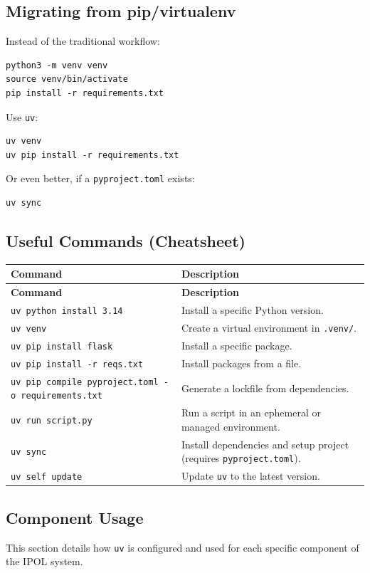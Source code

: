 \documentclass[a4paper,12pt]{article}
\begin{document}
\subsection{Migrating from pip/virtualenv}
Instead of the traditional workflow:
\begin{verbatim}
python3 -m venv venv
source venv/bin/activate
pip install -r requirements.txt
\end{verbatim}
Use \texttt{uv}:
\begin{verbatim}
uv venv
uv pip install -r requirements.txt
\end{verbatim}
Or even better, if a \texttt{pyproject.toml} exists:
\begin{verbatim}
uv sync
\end{verbatim}

\subsection{Useful Commands (Cheatsheet)}

\begin{longtable}{|p{6cm}|p{8cm}|}
\hline
\textbf{Command} & \textbf{Description} \\ \hline
\endfirsthead
\hline
\textbf{Command} & \textbf{Description} \\ \hline
\endhead
\texttt{uv python install 3.14} & Install a specific Python version. \\ \hline
\texttt{uv venv} & Create a virtual environment in \texttt{.venv/}. \\ \hline
\texttt{uv pip install flask} & Install a specific package. \\ \hline
\texttt{uv pip install -r reqs.txt} & Install packages from a file. \\ \hline
\texttt{uv pip compile pyproject.toml -o requirements.txt} & Generate a lockfile from dependencies. \\ \hline
\texttt{uv run script.py} & Run a script in an ephemeral or managed environment. \\ \hline
\texttt{uv sync} & Install dependencies and setup project (requires \texttt{pyproject.toml}). \\ \hline
\texttt{uv self update} & Update \texttt{uv} to the latest version. \\ \hline
\end{longtable}

\subsection{Component Usage}
This section details how \texttt{uv} is configured and used for each specific component of the IPOL system.
\end{document}
